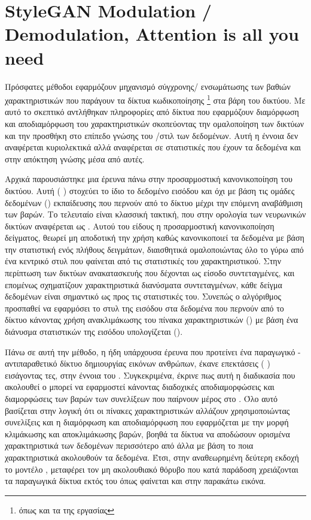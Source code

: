 \section{StyleGAN Modulation / Demodulation, Attention is all you need}

    Πρόσφατες μέθοδοι εφαρμόζουν μηχανισμό σύγχρονης/   ενσωμάτωσης των βαθιών χαρακτηριστικών  που παράγουν τα δίκτυα κωδικοποίησης \footnote{όπως και τα  της εργασίας} στα βάρη του δικτύου.
    Με αυτό το σκεπτικό αντλήθηκαν πληροφορίες από δίκτυα που εφαρμόζουν διαμόρφωση και αποδιαμόρφωση του χαρακτηριστικών σκοπεύοντας την ομαλοποίηση των δικτύων και την προσθήκη στο επίπεδο γνώσης του /στιλ των δεδομένων. Αυτή η έννοια δεν αναφέρεται κυριολεκτικά αλλά αναφέρεται σε στατιστικές που έχουν τα δεδομένα και στην απόκτηση γνώσης μέσα από αυτές. 
    
    Αρχικά παρουσιάστηκε μια έρευνα πάνω στην προσαρμοστική κανονικοποίηση του δικτύου. Αυτή ( \cite{huang2017arbitrary}) στοχεύει το ίδιο το δεδομένο εισόδου και όχι με βάση τις ομάδες δεδομένων () εκπαίδευσης που περνούν από το δίκτυο μέχρι την επόμενη αναβάθμιση των βαρών. Το τελευταίο είναι κλασσική τακτική, που στην ορολογία των νευρωνικών δικτύων αναφέρεται ως . Αυτού του είδους η προσαρμοστική κανονικοποίηση δείγματος,  θεωρεί μη αποδοτική την χρήση  καθώς κανονικοποιεί τα δεδομένα με βάση την στατιστική ενός πλήθους δειγμάτων, διαισθητικά ομαλοποιώντας όλο το  γύρω από ένα κεντρικό στυλ που φαίνεται από τις στατιστικές του χαρακτηριστικού. Στην περίπτωση των δικτύων ανακατασκευής που δέχονται ως είσοδο συντεταγμένες, και επομένως σχηματίζουν χαρακτηριστικά διανύσματα συντεταγμένων, κάθε δείγμα δεδομένων είναι σημαντικό ως προς τις στατιστικές του. Συνεπώς ο  αλγόριθμος προσπαθεί να εφαρμόσει το στυλ της εισόδου στα δεδομένα που περνούν από το δίκτυο κάνοντας χρήση ανακλιμάκωσης του πίνακα χαρακτηριστικών () με βάση ένα διάνυσμα στατιστικών της εισόδου υπολογίζεται ().

\par
    Πάνω σε αυτή την μέθοδο, η ήδη υπάρχουσα έρευνα  που προτείνει ένα παραγωγικό - αντιπαραθετικό δίκτυο δημιουργίας εικόνων ανθρώπων, έκανε επεκτάσεις ( \cite{karras2020analyzing}) εισάγοντας τες, στην έννοια του . Συγκεκριμένα, έκρινε πως αυτή η διαδικασία που ακολουθεί ο  μπορεί να εφαρμοστεί κάνοντας διαδοχικές αποδιαμορφώσεις και διαμορφώσεις των βαρών των συνελίξεων που παίρνουν μέρος στο . Όλο αυτό βασίζεται στην λογική ότι οι πίνακες χαρακτηριστικών αλλάζουν χρησιμοποιώντας συνελίξεις και η διαμόρφωση και αποδιαμόρφωση που εφαρμόζεται με την μορφή κλιμάκωσης και αποκλιμάκωσης βαρών, βοηθά τα δίκτυα να αποδώσουν ορισμένα χαρακτηριστικά των δεδομένων περισσότερο από άλλα με βάση το ποια χαρακτηριστικά ακολουθούν τα δεδομένα. Έτσι, στην αναθεωρημένη δεύτερη εκδοχή το μοντέλο  \cite{karras2020analyzing}, μεταφέρει τον μη ακολουθιακό θόρυβο που κατά παράδοση χρειάζονται τα παραγωγικά δίκτυα εκτός του  όπως φαίνεται και στην παρακάτω εικόνα.
    
